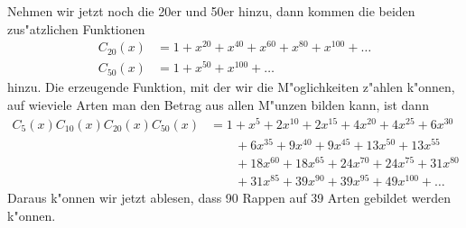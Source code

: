\begin{beispiele}
Nehmen wir jetzt noch die 20er und 50er hinzu, dann kommen die beiden
zus"atzlichen Funktionen
\begin{align*}
C_{20}(x)&= 1+x^{20}+x^{40}+x^{60}+x^{80}+x^{100}+\dots\\
C_{50}(x)&=1+x^{50}+x^{100}+\dots
\end{align*}
hinzu. Die erzeugende Funktion, mit der wir die M"oglichkeiten z"ahlen
k"onnen, auf wieviele Arten man den Betrag aus allen M"unzen bilden kann,
ist dann
\begin{align*}
C_5(x) C_{10}(x) C_{20}(x) C_{50}(x)
&=
1+x^5+2 x^{10}+2 x^{15}+4 x^{20}+4 x^{25}+6 x^{30}\\
&\qquad
+6 x^{35} +9 x^{40} +9 x^{45}+13 x^{50}+13 x^{55}\\
&\qquad
+18 x^{60}+18 x^{65} +24 x^{70}+24 x^{75}+31 x^{80}\\
&\qquad
+31 x^{85}+39 x^{90}+39 x^{95} +49 x^{100}+\dots
\end{align*}
Daraus k"onnen wir jetzt ablesen, dass 90 Rappen auf 39 Arten
gebildet werden k"onnen.
\end{beispiele}

